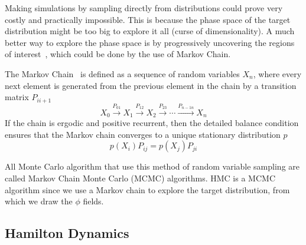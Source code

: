 Making simulations by sampling directly from distributions could prove very costly and practically impossible. This is because the phase space of the target distribution might be too big to explore it all (curse of dimensionality). A much better way to explore the phase space is by progressively uncovering the regions of interest~\cite{mhexpl}, which could be done by the use of Markov Chain.

The Markov Chain~\cite{intromarkov} is defined as a sequence of random variables $X_n$, where every next element is generated from the previous element in the chain by a transition matrix $P_{ii+1}$
\begin{equation}
    X_0 \xrightarrow{P_{01}} X_1 \xrightarrow{P_{12}} X_2 \xrightarrow{P_{23}} \cdots \xrightarrow{P_{n-1n}} X_n
\end{equation}
If the chain is ergodic and positive recurrent, then the detailed balance condition ensures that the Markov chain converges to a unique stationary distribution $p$
\begin{equation}
    p(X_i) P_{ij} = p(X_j) P_{ji}
\end{equation}

All Monte Carlo algorithm that use this method of random variable sampling are called Markov Chain Monte Carlo (MCMC) algorithms. HMC is a MCMC algorithm since we use a Markov chain to explore the target distribution, from which we draw the $\phi$ fields.

\subsection{Hamilton Dynamics}


